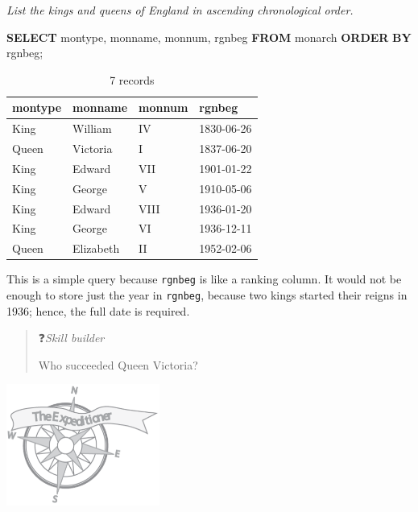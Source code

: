 \documentclass[
]{article}
\newenvironment{Shaded}{\begin{snugshade}}{\end{snugshade}}
\newcommand{\KeywordTok}[1]{\textcolor[rgb]{0.13,0.29,0.53}{\textbf{#1}}}
\newcommand{\NormalTok}[1]{#1}
\begin{document}
\emph{List the kings and queens of England in ascending chronological order.}

\begin{Shaded}
\begin{Highlighting}[]
\KeywordTok{SELECT}\NormalTok{ montype, monname, monnum, rgnbeg}
    \KeywordTok{FROM}\NormalTok{ monarch }\KeywordTok{ORDER} \KeywordTok{BY}\NormalTok{ rgnbeg;}
\end{Highlighting}
\end{Shaded}

\begin{table}

\caption{\label{tab:unnamed-chunk-85}7 records}
\centering
\begin{tabular}[t]{l|l|l|l}
\hline
montype & monname & monnum & rgnbeg\\
\hline
King & William & IV & 1830-06-26\\
\hline
Queen & Victoria & I & 1837-06-20\\
\hline
King & Edward & VII & 1901-01-22\\
\hline
King & George & V & 1910-05-06\\
\hline
King & Edward & VIII & 1936-01-20\\
\hline
King & George & VI & 1936-12-11\\
\hline
Queen & Elizabeth & II & 1952-02-06\\
\hline
\end{tabular}
\end{table}

This is a simple query because \texttt{rgnbeg} is like a ranking column. It
would not be enough to store just the year in \texttt{rgnbeg}, because two
kings started their reigns in 1936; hence, the full date is required.

\begin{quote}
❓\emph{Skill builder}

Who succeeded Queen Victoria?
\end{quote}

\includegraphics[width=1.97917in,height=\textheight]{Figures/Chapter 1/expeditioner.png}
\end{document}
